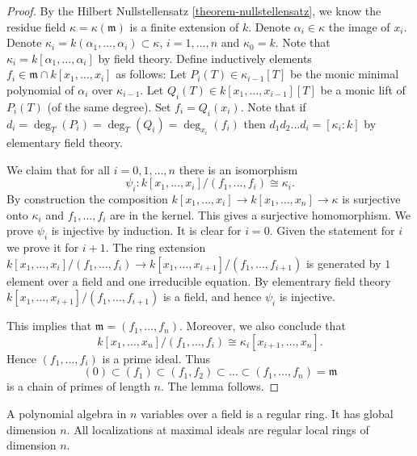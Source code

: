\begin{proof}
By the Hilbert Nullstellensatz \ref{theorem-nullstellensatz},
we know the residue field $\kappa = \kappa(\mathfrak m)$ is
a finite extension of $k$. Denote $\alpha_i \in \kappa$ the
image of $x_i$. Denote $\kappa_i = k(\alpha_1, \ldots, \alpha_i)
\subset \kappa$, $i = 1, \ldots, n$ and $\kappa_0 = k$.
Note that $\kappa_i = k[\alpha_1, \ldots, \alpha_i]$
by field theory. Define inductively elements
$f_i \in \mathfrak m \cap k[x_1, \ldots, x_i]$
as follows: Let $P_i(T) \in \kappa_{i-1}[T]$
be the monic minimal polynomial of $\alpha_i $ over $\kappa_{i-1}$.
Let $Q_i(T) \in k[x_1, \ldots, x_{i-1}][T]$ be a monic lift of $P_i(T)$
(of the same degree). Set $f_i = Q_i(x_i)$.
Note that if $d_i = \deg_T(P_i) = \deg_T(Q_i) = \deg_{x_i}(f_i)$
then $d_1d_2\ldots d_i = [\kappa_i : k]$ by elementary field theory.

\medskip\noindent
We claim that for all $i = 0, 1, \ldots, n$ there is an
isomorphism
$$
\psi_i : k[x_1, \ldots, x_i] /(f_1, \ldots, f_i) \cong \kappa_i.
$$
By construction the composition
$k[x_1, \ldots, x_i] \to k[x_1, \ldots, x_n] \to \kappa$
is surjective onto $\kappa_i$ and $f_1, \ldots, f_i$ are
in the kernel. This gives a surjective homomorphism.
We prove $\psi_i$ is injective by induction. It is clear for $i = 0$.
Given the statement for $i$ we prove it for $i + 1$.
The ring extension $k[x_1, \ldots, x_i]/(f_1, \ldots, f_i) \to
k[x_1, \ldots, x_{i + 1}]/(f_1, \ldots, f_{i + 1})$
is generated by $1$ element over a field and one
irreducible equation. By elementrary field theory
$k[x_1, \ldots, x_{i + 1}]/(f_1, \ldots, f_{i + 1})$
is a field, and hence $\psi_i$ is injective.

\medskip\noindent
This implies that $\mathfrak m = (f_1, \ldots, f_n)$.
Moreover, we also conclude that
$$
k[x_1, \ldots, x_n]/(f_1, \ldots, f_i)
\cong
\kappa_i[x_{i + 1}, \ldots, x_n].
$$
Hence $(f_1, \ldots, f_i)$ is a prime ideal. Thus
$$
(0) \subset (f_1) \subset (f_1, f_2) \subset \ldots \subset
(f_1, \ldots, f_n) = \mathfrak m
$$
is a chain of primes of length $n$. The lemma follows.
\end{proof}

\begin{proposition}
\label{proposition-finite-gl-dim-polynomial-ring}
A polynomial algebra in $n$ variables over a field is a regular ring.
It has global dimension $n$. All localizations at maximal ideals
are regular local rings of dimension $n$.
\end{proposition}

